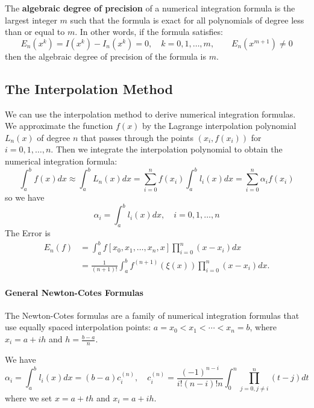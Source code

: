 \documentclass{matharticle}
\begin{document}
\begin{definition}
	The \textbf{algebraic degree of precision} of a numerical integration formula is the largest integer $m$ such that the formula is exact for all polynomials of degree less than or equal to $m$. In other words, if the formula satisfies:
	\begin{equation}
		E_n(x^k) = I(x^k) - I_n(x^k) = 0, \quad k = 0, 1, \ldots, m, \qquad E_n(x^{m+1}) \neq 0
	\end{equation}
	then the algebraic degree of precision of the formula is $m$.
\end{definition}

\subsection{The Interpolation Method}
We can use the interpolation method to derive numerical integration formulas. We approximate the function $f(x)$ by the Lagrange interpolation polynomial $L_n(x)$ of degree $n$ that passes through the points $(x_i, f(x_i))$ for $i = 0, 1, \ldots, n$. Then we integrate the interpolation polynomial to obtain the numerical integration formula:
\begin{equation}
	\int_{a}^{b} f(x) dx \approx \int_{a}^{b} L_n(x) dx = \sum_{i=0}^{n} f(x_i) \int_{a}^{b} l_i(x) dx = \sum_{i=0}^{n} \alpha_i f(x_i)
\end{equation}
so we have
\begin{equation}
	\alpha_i = \int_{a}^{b} l_i(x) dx, \quad i = 0, 1, \ldots, n
\end{equation}
The Error is
\begin{equation}
	\begin{aligned}
		E_n(f) & = \int_{a}^{b} f[x_0, x_1, \ldots, x_n, x] \prod_{i=0}^{n} (x - x_i) dx         \\
		       & = \frac{1}{(n+1)!} \int_{a}^{b} f^{(n+1)}(\xi(x)) \prod_{i=0}^{n} (x - x_i) dx.
	\end{aligned}
\end{equation}

\paragraph{General Newton-Cotes Formulas}
The Newton-Cotes formulas are a family of numerical integration formulas that use equally spaced interpolation points: $a = x_0 < x_1 < \cdots < x_n = b$, where $x_i = a + i h$ and $h = \frac{b - a}{n}$.

We have
\begin{equation}
	\alpha_i = \int_{a}^{b} l_i(x) dx = (b-a) c_i^{(n)}, \quad c_i^{(n)} = \frac{(-1)^{n-i}}{i! (n-i)! n} \int_{0}^{n} \prod_{j=0, j \neq i}^{n} (t - j) dt
\end{equation}
where we set $x = a + t h$ and $x_i = a + i h$.
\end{document}
